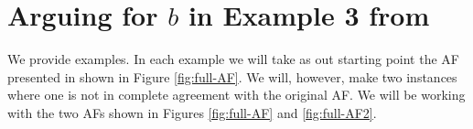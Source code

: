\documentclass{llncs}
\newcommand{\seq}[1]{\overrightarrow{#1}}
\begin{document}

%
%
%



\section{Arguing for $b$ in Example 3 from \cite{Caminada06}}
We provide  examples. In each example we will take as out starting point the AF presented in \cite{Caminada06} shown in Figure \ref{fig:full-AF}. We will, however, make two instances where one is not in complete agreement with the original AF. We will be working with the two AFs shown in Figures \ref{fig:full-AF} and \ref{fig:full-AF2}. 
\end{document}
